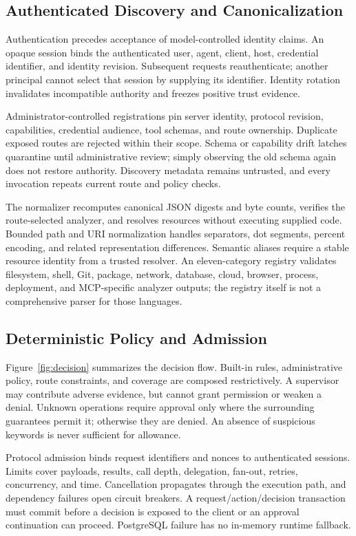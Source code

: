 \documentclass[conference,letterpaper]{IEEEtran}
\begin{document}
\subsection{Authenticated Discovery and Canonicalization}
Authentication precedes acceptance of model-controlled identity claims. An opaque session binds the authenticated user, agent, client, host, credential identifier, and identity revision. Subsequent requests reauthenticate; another principal cannot select that session by supplying its identifier. Identity rotation invalidates incompatible authority and freezes positive trust evidence.

Administrator-controlled registrations pin server identity, protocol revision, capabilities, credential audience, tool schemas, and route ownership. Duplicate exposed routes are rejected within their scope. Schema or capability drift latches quarantine until administrative review; simply observing the old schema again does not restore authority. Discovery metadata remains untrusted, and every invocation repeats current route and policy checks.

The normalizer recomputes canonical JSON digests and byte counts, verifies the route-selected analyzer, and resolves resources without executing supplied code. Bounded path and URI normalization handles separators, dot segments, percent encoding, and related representation differences. Semantic aliases require a stable resource identity from a trusted resolver. An eleven-category registry validates filesystem, shell, Git, package, network, database, cloud, browser, process, deployment, and MCP-specific analyzer outputs; the registry itself is not a comprehensive parser for those languages.

\subsection{Deterministic Policy and Admission}
Figure~\ref{fig:decision} summarizes the decision flow. Built-in rules, administrative policy, route constraints, and coverage are composed restrictively. A supervisor may contribute adverse evidence, but cannot grant permission or weaken a denial. Unknown operations require approval only where the surrounding guarantees permit it; otherwise they are denied. An absence of suspicious keywords is never sufficient for allowance.

Protocol admission binds request identifiers and nonces to authenticated sessions. Limits cover payloads, results, call depth, delegation, fan-out, retries, concurrency, and time. Cancellation propagates through the execution path, and dependency failures open circuit breakers. A request/action/decision transaction must commit before a decision is exposed to the client or an approval continuation can proceed. PostgreSQL failure has no in-memory runtime fallback.
\end{document}
